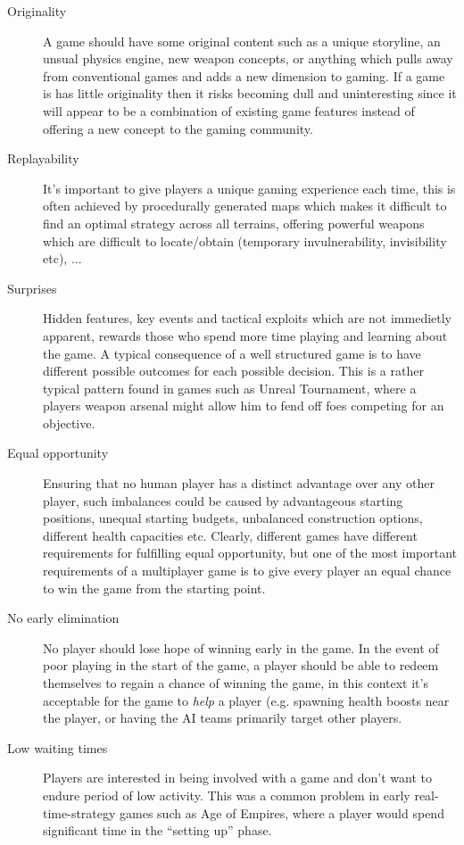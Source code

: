 \begin{description}

\item[Originality] A game should have some original content such as a unique storyline, an unsual physics engine, new weapon concepts, or anything which pulls away from conventional games and adds a new dimension to gaming. If a game is has little originality then it risks becoming dull and uninteresting since it will appear to be a combination of existing game features instead of offering a new concept to the gaming community.

\item[Replayability] It's important to give players a unique gaming experience each time, this is often achieved by procedurally generated maps which makes it difficult to find an optimal strategy across all terrains, offering powerful weapons which are difficult to locate/obtain (temporary invulnerability, invisibility etc), 
...
\item[Surprises] Hidden features, key events and tactical exploits which are not immedietly apparent, rewards those who spend more time playing and learning about the game. A typical consequence of a well structured game is to have different possible outcomes for each possible decision. This is a rather typical pattern found in games such as Unreal Tournament, where a players weapon arsenal might allow him to fend off foes competing for an objective.

\item[Equal opportunity]
Ensuring that no human player has a distinct advantage over any other player, such imbalances could be caused by advantageous starting positions, unequal starting budgets, unbalanced construction options, different health capacities etc. Clearly, different games have different requirements for fulfilling equal opportunity, but one of the most important requirements of a multiplayer game is to give every player an equal chance to win the game from the starting point.

\item[No early elimination]
No player should lose hope of winning early in the game. In the event of poor playing in the start of the game, a player should be able to redeem themselves to regain a chance of winning the game, in this context it's acceptable for the game to \emph{help} a player (e.g. spawning health boosts near the player, or having the AI teams primarily target other players.

\item[Low waiting times]
Players are interested in being involved with a game and don't want to endure period of low activity. This was a common problem in early real-time-strategy games such as Age of Empires, where a player would spend significant time in the ``setting up'' phase.

\end{description}



